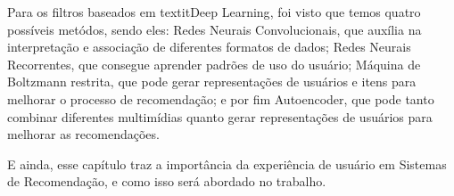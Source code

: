 Para os filtros baseados em textit{Deep Learning}, foi visto que temos quatro possíveis metódos, sendo eles: Redes Neurais 
Convolucionais, que auxília na interpretação e associação de diferentes formatos de dados; Redes Neurais Recorrentes, 
que consegue aprender padrões de uso do usuário; Máquina de Boltzmann restrita, que pode gerar representações de usuários
e itens para melhorar o processo de recomendação; e por fim Autoencoder, que pode tanto combinar diferentes multimídias quanto 
gerar representações de usuários para melhorar as recomendações.

E ainda, esse capítulo traz a importância da experiência de usuário em Sistemas de Recomendação, e como isso será abordado
no trabalho.